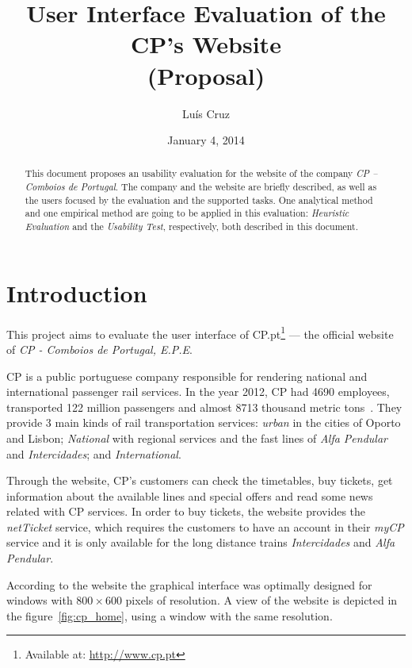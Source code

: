 \documentclass[a4paper]{article}
\title{User Interface Evaluation of the CP's Website\\ (Proposal)}
\author[1]{Luís  Cruz}
\affil[1]{MAP-i\\ Joint Doctoral Programme in Computer Science}
\date{January 4, 2014}
\begin{document}
\maketitle

\begin{abstract}
  This document proposes an usability evaluation for the website of the company \emph{CP -- Comboios de Portugal}. The company and the website are briefly described, as well as the users focused by the evaluation and the supported tasks. One analytical method and one empirical method are going to be applied in this evaluation: \emph{Heuristic Evaluation} and the \emph{Usability Test}, respectively, both described in this document.
\end{abstract}

\section{Introduction}

This project aims to evaluate the user interface of CP.pt\footnote{Available at: \url{http://www.cp.pt}} --- the official website of \emph{CP - Comboios de Portugal, E.P.E}.

CP is a public portuguese company responsible for rendering national and international passenger rail services. In the year 2012, CP had 4690 employees, transported 122 million passengers and almost 8713 thousand metric tons~\citep{CP2012aa}. They provide 3 main kinds of rail transportation services: \emph{urban} in the cities of Oporto and Lisbon; \emph{National} with regional services and the fast lines of \emph{Alfa Pendular} and \emph{Intercidades}; and \emph{International}.

Through the website, CP's customers can check the timetables, buy tickets, get information about the available lines and special offers and read some news related with CP services. In order to buy tickets, the website provides the \emph{netTicket} service, which requires the customers to have an account in their \emph{myCP} service and it is only available for the long distance trains \emph{Intercidades} and \emph{Alfa Pendular}.

According to the website the graphical interface was optimally designed for windows with $800\times 600$ pixels of resolution. A view of the website is depicted in the figure~\ref{fig:cp_home}, using a window with the same resolution. 
\end{document}
